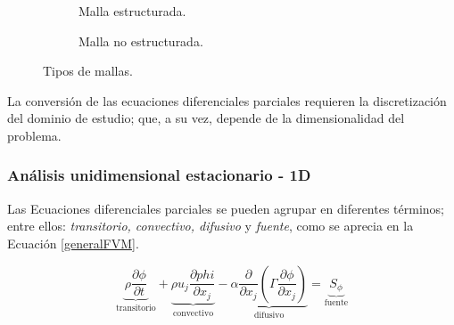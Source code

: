 \begin{figure}[h!]
	\centering
	\begin{subfigure}[b]{0.48\textwidth}
		\centering
		\begin{adjustbox}{max width = \textwidth}
		\end{adjustbox}
		\caption{Malla estructurada.}
	\end{subfigure}
	\hfill
	\begin{subfigure}[b]{0.5\textwidth}
		\centering
		\begin{adjustbox}{max width = \textwidth}
		\end{adjustbox}
	\caption{Malla no estructurada.}
	\end{subfigure}
	\caption{Tipos de mallas.}
	\label{mallas}
\end{figure}

\noindent
\justify

La conversi\'on de las ecuaciones diferenciales parciales requieren la discretizaci\'on del dominio de estudio; que, a su vez, depende de la dimensionalidad del problema.

\subsubsection{An\'alisis unidimensional estacionario - 1D} \label{esta1D}

\noindent
\justify

Las Ecuaciones diferenciales parciales se pueden agrupar en diferentes t\'erminos; entre ellos: \textit{transitorio, convectivo, difusivo} y \textit{fuente}, como se aprecia en la Ecuaci\'on \ref{generalFVM}.

\begin{equation}
\underbrace{\rho \frac{\partial \phi}{\partial t}}_{\text{transitorio}} + \underbrace{\rho u_j \frac{\partial phi}{\partial x_j}}_{\text{convectivo}} - \underbrace{\alpha \frac{\partial}{\partial x_j} \left( \Gamma \frac{\partial \phi}{\partial x_j} \right)}_{\text{difusivo}} = \underbrace{S_{\phi}}_{\text{fuente}}
\label{generalFVM}
\end{equation}

